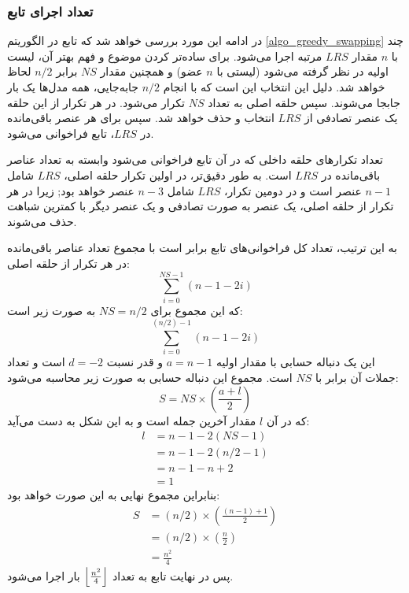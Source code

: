 \subsubsection{
	تعداد اجرای تابع
}\label{counting_model_similarity}
در ادامه این مورد بررسی خواهد شد که تابع
در الگوریتم
\ref{algo_greedy_swapping}
چند مرتبه اجرا می‌شود. 
برای ساده‌تر کردن موضوع و فهم بهتر آن، لیست ‎\(LRS\) با \( n \) مقدار اولیه در نظر گرفته می‌شود (لیستی با \( n \) عضو) و همچنین مقدار \( NS \) برابر \( n/2 \) لحاظ خواهد شد. دلیل این انتخاب این است که با انجام \( n/2 \) جابه‌جایی، همه مدل‌ها یک بار جابجا می‌شوند.
سپس حلقه اصلی به تعداد \( NS \) تکرار می‌شود. در هر تکرار از این حلقه یک عنصر تصادفی از \( LRS \) انتخاب و حذف خواهد شد. سپس برای هر عنصر باقی‌مانده در \( LRS \)، تابع
فراخوانی می‌شود.

تعداد تکرارهای حلقه داخلی که در آن تابع
فراخوانی می‌شود وابسته به تعداد عناصر باقی‌مانده در \( LRS \) است. به طور دقیق‌تر، در اولین تکرار حلقه اصلی، \( LRS \) شامل \(n-1\) عنصر است و در دومین تکرار، \( LRS \) شامل \(n-3\) عنصر خواهد بود; زیرا در هر تکرار از حلقه اصلی، یک عنصر به صورت تصادفی و یک عنصر دیگر با کمترین شباهت حذف می‌شوند.

به این ترتیب، تعداد کل فراخوانی‌های تابع
برابر است با مجموع تعداد عناصر باقی‌مانده در هر تکرار از حلقه اصلی:
\begin{equation}
	\sum_{i=0}^{NS-1} (n-1-2i)
\end{equation}
که این مجموع برای \( NS=n/2 \) به صورت زیر است:
\begin{equation}
	\sum_{i=0}^{(n/2)-1} (n-1-2i)
\end{equation}
این یک دنباله حسابی با مقدار اولیه \(a=n-1\) و قدر نسبت
 \(d=-2\) 
است و تعداد جملات آن برابر با \( NS \) است.
مجموع این دنباله حسابی به صورت زیر محاسبه می‌شود:
\begin{equation}
	S = NS \times \left( \frac{a+l}{2} \right)
\end{equation}
که در آن \( l \) مقدار آخرین جمله است و به این شکل به دست می‌آید:
\begin{equation}
	\begin{align*} 
		l &= n-1-2(NS-1) \\
		  &= n-1-2(n/2-1) \\
		  &= n-1-n+2 \\
		  &= 1
	\end{align*}
\end{equation}
بنابراین مجموع نهایی به این صورت خواهد بود:
\begin{equation}
	\begin{align*} 
		S &= (n/2) \times \left( \frac{(n-1)+1}{2} \right) \\
		&= (n/2) \times \left( \frac{n}{2} \right) \\
		&= \frac{n^2}{4}
	\end{align*}
\end{equation}
پس در نهایت تابع
به تعداد
\(
\left \lfloor \frac{n^2}{4} \right \rfloor
 \) 
بار اجرا می‌شود.


